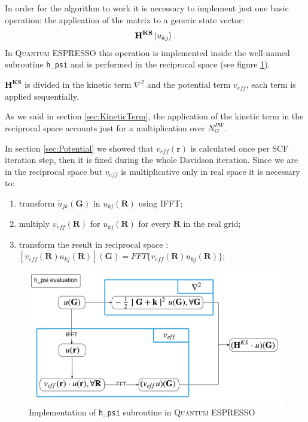 \documentclass[a4paper,12pt]{article}
\newcommand\mf[1]{\mathbf{#1}}
\newcommand\erre{\mathbf{r}}
\newcommand\GI{\mathbf{G}}
\newcommand\QE{\textsc{Quantum} ESPRESSO }
\begin{document}
In order for the algorithm to work it is necessary to implement just one basic operation: the application of the matrix to a generic state vector:
\begin{equation}
	\mf{H^{KS}} \ket{u_{kj}}.
\end{equation}
In \QE this operation is implemented inside the well-named subroutine \texttt{h\_psi} and is performed in the reciprocal space (see figure \ref{fig:hpsi}).

$\mf{H^{KS}}$ is divided in the kinetic term $\nabla^2$ and the potential term $v_{eff}$, each term is applied sequentially.

As we said in section \ref{sec:KineticTerm}, the application of the kinetic term in the reciprocal space accounts just for a multiplication over $N^{PW}_G$.

In section \ref{sec:Potential} we showed that $v_{eff}(\erre)$ is calculated once per SCF iteration step, then it is fixed during the whole Davidson iteration. Since we are in the reciprocal space but $v_{eff}$ is multiplicative only in real space it is necessary to: 
\begin{enumerate}
	\item transform $\tilde{u}_{jk}(\GI)$ in $u_{kj}(\mf{R})$ using IFFT;
	\item multiply $v_{eff}(\mf{R})$ for $u_{kj}(\mf{R})$ for every $\mf{R}$ in the real grid;
	\item transform the result in reciprocal space : \\ $[v_{eff}(\mf{R}) u_{kj}(\mf{R})](\GI) = FFT\{v_{eff}(\mf{R}) u_{kj}(\mf{R})\}$;
\end{enumerate}

\begin{figure}[h]
\begin{center}
	\begin{framed}
	\includegraphics[width=\linewidth]{h_psi.pdf}

	\end{framed}
\caption{Implementation of \texttt{h\_psi} subroutine in \QE}
	\label{fig:hpsi}
\end{center}
\end{figure}
\end{document}
